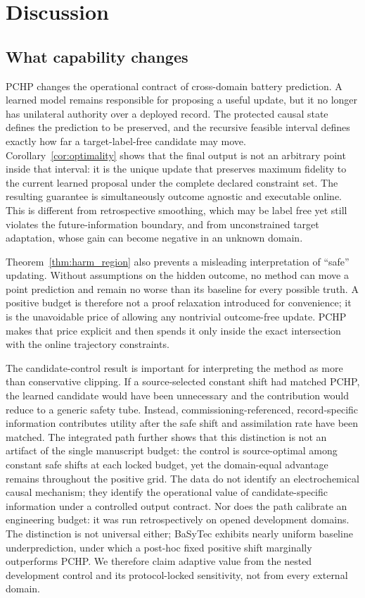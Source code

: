 \documentclass[11pt]{article}
\begin{document}
\section{Discussion}

\subsection{What capability changes}

PCHP changes the operational contract of cross-domain battery prediction. A learned model remains responsible for proposing a useful update, but it no longer has unilateral authority over a deployed record. The protected causal state defines the prediction to be preserved, and the recursive feasible interval defines exactly how far a target-label-free candidate may move. Corollary~\ref{cor:optimality} shows that the final output is not an arbitrary point inside that interval: it is the unique update that preserves maximum fidelity to the current learned proposal under the complete declared constraint set. The resulting guarantee is simultaneously outcome agnostic and executable online. This is different from retrospective smoothing, which may be label free yet still violates the future-information boundary, and from unconstrained target adaptation, whose gain can become negative in an unknown domain.

Theorem~\ref{thm:harm_region} also prevents a misleading interpretation of ``safe'' updating. Without assumptions on the hidden outcome, no method can move a point prediction and remain no worse than its baseline for every possible truth. A positive budget is therefore not a proof relaxation introduced for convenience; it is the unavoidable price of allowing any nontrivial outcome-free update. PCHP makes that price explicit and then spends it only inside the exact intersection with the online trajectory constraints.

The candidate-control result is important for interpreting the method as more than conservative clipping. If a source-selected constant shift had matched PCHP, the learned candidate would have been unnecessary and the contribution would reduce to a generic safety tube. Instead, commissioning-referenced, record-specific information contributes utility after the safe shift and assimilation rate have been matched. The integrated path further shows that this distinction is not an artifact of the single manuscript budget: the control is source-optimal among constant safe shifts at each locked budget, yet the domain-equal advantage remains throughout the positive grid. The data do not identify an electrochemical causal mechanism; they identify the operational value of candidate-specific information under a controlled output contract. Nor does the path calibrate an engineering budget: it was run retrospectively on opened development domains. The distinction is not universal either; BaSyTec exhibits nearly uniform baseline underprediction, under which a post-hoc fixed positive shift marginally outperforms PCHP. We therefore claim adaptive value from the nested development control and its protocol-locked sensitivity, not from every external domain.
\end{document}
